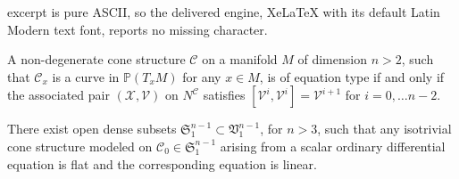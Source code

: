 \documentclass[10pt,a4paper]{amsart}
\newcommand{\CC}{\mathcal{C}}
\newcommand{\PP}{\mathbb{P}}
\newcommand{\Set}{\mathfrak{S}}
\newcommand{\VV}{\mathcal{V}}
\newcommand{\XX}{\mathcal{X}}
\begin{document}
excerpt is pure ASCII, so the delivered engine, XeLaTeX with its default Latin Modern text font, reports no missing character.
\begin{proposition}\label{prop1}
A non-degenerate cone structure $\CC$ on a manifold $M$ of dimension $n>2$, such that $\CC_x$ is a curve in $\PP(T_xM)$ for any $x\in M$, is of equation type if and only if the associated pair $(\XX,\VV)$ on $N^\CC$ satisfies $[\VV^i,\VV^i]=\VV^{i+1}$ for $i=0,\ldots n-2$.
\end{proposition}

\begin{theorem}\label{thm1}
There exist open dense subsets $\Set_1^{n-1} \subset \mathfrak{V}^{n-1}_1$, for $n>3$, such that any isotrivial cone structure modeled on $\CC_0 \in \Set_1^{n-1}$ arising from a scalar ordinary differential equation is flat and the corresponding equation is linear.
\end{theorem}
\end{document}
